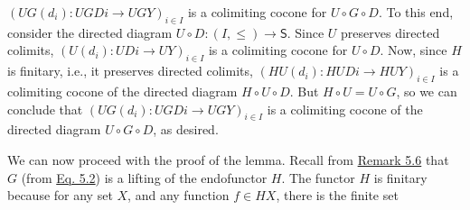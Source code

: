 \hypertarget{html:S7.SS0.SSS0.P0.SPx1.p2.m8}{}\({(UG(d_{i})\colon UGDi\to UGY)_{i\in I}}\) is a colimiting cocone for %
\hypertarget{html:S7.SS0.SSS0.P0.SPx1.p2.m9}{}\({U\circ G\circ D}\). To this end, consider the directed diagram %
\hypertarget{html:S7.SS0.SSS0.P0.SPx1.p2.m10}{}\({U\circ D\colon(I,\leq)\to\mathsf{S}}\). Since %
\hypertarget{html:S7.SS0.SSS0.P0.SPx1.p2.m11}{}\({U}\) preserves directed colimits, %
\hypertarget{html:S7.SS0.SSS0.P0.SPx1.p2.m12}{}\({(U(d_{i})\colon UDi\to UY)_{i\in I}}\) is a colimiting cocone for %
\hypertarget{html:S7.SS0.SSS0.P0.SPx1.p2.m13}{}\({U\circ D}\). Now, since %
\hypertarget{html:S7.SS0.SSS0.P0.SPx1.p2.m14}{}\({H}\) is finitary, i.e., it preserves directed colimits, %
\hypertarget{html:S7.SS0.SSS0.P0.SPx1.p2.m15}{}\({(HU(d_{i})\colon HUDi\to HUY)_{i\in I}}\) is a colimiting cocone of the directed diagram %
\hypertarget{html:S7.SS0.SSS0.P0.SPx1.p2.m16}{}\({H\circ U\circ D}\). But %
\hypertarget{html:S7.SS0.SSS0.P0.SPx1.p2.m17}{}\({H\circ U=U\circ G}\), so we can conclude that %
\hypertarget{html:S7.SS0.SSS0.P0.SPx1.p2.m18}{}\({(UG(d_{i})\colon UGDi\to UGY)_{i\in I}}\) is a colimiting cocone of the directed diagram %
\hypertarget{html:S7.SS0.SSS0.P0.SPx1.p2.m19}{}\({U\circ G\circ D}\), as desired.
\par\medskip
\hypertarget{html:S7.SS0.SSS0.P0.SPx1.p3}{} We can now proceed with the proof of the lemma. Recall from \hyperlink{html:S5.Thmtheorem6}{Remark 5.6} that %
\hypertarget{html:S7.SS0.SSS0.P0.SPx1.p3.m1}{}\({G}\) (from \hyperlink{html:S5.E2}{Eq. 5.2}) is a lifting of the endofunctor %
\hypertarget{html:S7.SS0.SSS0.P0.SPx1.p3.m2}{}\({H}\). The functor %
\hypertarget{html:S7.SS0.SSS0.P0.SPx1.p3.m3}{}\({H}\) is finitary because for any set %
\hypertarget{html:S7.SS0.SSS0.P0.SPx1.p3.m4}{}\({X}\), and any function %
\hypertarget{html:S7.SS0.SSS0.P0.SPx1.p3.m5}{}\({f\in HX}\), there is the finite set %
